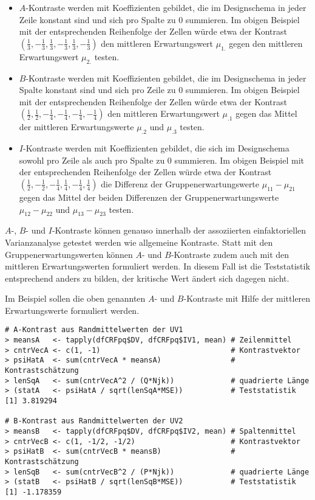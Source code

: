 \begin{itemize}
\item $A$-Kontraste werden mit Koeffizienten gebildet, die im Designschema in jeder Zeile konstant sind und sich pro Spalte zu $0$ summieren. Im obigen Beispiel mit der entsprechenden Reihenfolge der Zellen würde etwa der Kontrast $(\frac{1}{3}, -\frac{1}{3}, \frac{1}{3}, -\frac{1}{3}, \frac{1}{3}, -\frac{1}{3})$ den mittleren Erwartungswert $\mu_{1.}$ gegen den mittleren Erwartungswert $\mu_{2.}$ testen.
\item $B$-Kontraste werden mit Koeffizienten gebildet, die im Designschema in jeder Spalte konstant sind und sich pro Zeile zu $0$ summieren. Im obigen Beispiel mit der entsprechenden Reihenfolge der Zellen würde etwa der Kontrast $(\frac{1}{2}, \frac{1}{2}, -\frac{1}{4}, -\frac{1}{4}, -\frac{1}{4}, -\frac{1}{4})$ den mittleren Erwartungswert $\mu_{.1}$ gegen das Mittel der mittleren Erwartungswerte $\mu_{.2}$ und $\mu_{.3}$ testen.
\item $I$-Kontraste werden mit Koeffizienten gebildet, die sich im Designschema sowohl pro Zeile als auch pro Spalte zu $0$ summieren. Im obigen Beispiel mit der entsprechenden Reihenfolge der Zellen würde etwa der Kontrast $(\frac{1}{2}, -\frac{1}{2}, -\frac{1}{4}, \frac{1}{4}, -\frac{1}{4}, \frac{1}{4})$ die Differenz der Gruppenerwartungswerte $\mu_{11}-\mu_{21}$ gegen das Mittel der beiden Differenzen der Gruppenerwartungswerte $\mu_{12}-\mu_{22}$ und $\mu_{13}-\mu_{23}$ testen.
\end{itemize}

$A$-, $B$- und $I$-Kontraste können genauso innerhalb der assoziierten einfaktoriellen Varianzanalyse getestet werden wie allgemeine Kontraste. Statt mit den Gruppenerwartungswerten können $A$- und $B$-Kontraste zudem auch mit den mittleren Erwartungswerten formuliert werden. In diesem Fall ist die Teststatistik entsprechend anders zu bilden, der kritische Wert ändert sich dagegen nicht.

Im Beispiel sollen die oben genannten $A$- und $B$-Kontraste mit Hilfe der mittleren Erwartungswerte formuliert werden.
\begin{lstlisting}
# A-Kontrast aus Randmittelwerten der UV1
> meansA   <- tapply(dfCRFpq$DV, dfCRFpq$IV1, mean) # Zeilenmittel
> cntrVecA <- c(1, -1)                              # Kontrastvektor
> psiHatA  <- sum(cntrVecA * meansA)                # Kontrastschätzung
> lenSqA   <- sum(cntrVecA^2 / (Q*Njk))             # quadrierte Länge
> (statA   <- psiHatA / sqrt(lenSqA*MSE))           # Teststatistik
[1] 3.819294

# B-Kontrast aus Randmittelwerten der UV2
> meansB   <- tapply(dfCRFpq$DV, dfCRFpq$IV2, mean) # Spaltenmittel
> cntrVecB <- c(1, -1/2, -1/2)                      # Kontrastvektor
> psiHatB  <- sum(cntrVecB * meansB)                # Kontrastschätzung
> lenSqB   <- sum(cntrVecB^2 / (P*Njk))             # quadrierte Länge
> (statB   <- psiHatB / sqrt(lenSqB*MSE))           # Teststatistik
[1] -1.178359
\end{lstlisting}

